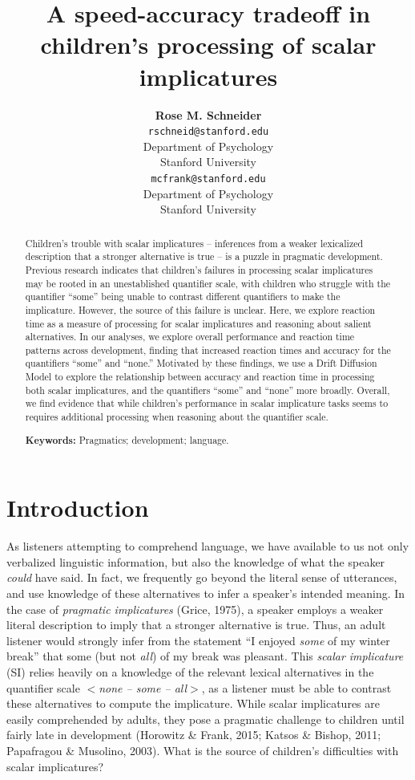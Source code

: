 \documentclass[10pt, letterpaper]{article}
\title{A speed-accuracy tradeoff in children's processing of scalar
implicatures}
\author{{\large \bf Rose M. Schneider} \\ \texttt{rschneid@stanford.edu} \\ Department of Psychology \\ Stanford University \And {\large \bf Michael C. Frank} \\ \texttt{mcfrank@stanford.edu} \\ Department of Psychology \\ Stanford University}
\begin{document}
\maketitle

\begin{abstract}
Children's trouble with scalar implicatures -- inferences from a weaker
lexicalized description that a stronger alternative is true -- is a
puzzle in pragmatic development. Previous research indicates that
children's failures in processing scalar implicatures may be rooted in
an unestablished quantifier scale, with children who struggle with the
quantifier ``some'' being unable to contrast different quantifiers to
make the implicature. However, the source of this failure is unclear.
Here, we explore reaction time as a measure of processing for scalar
implicatures and reasoning about salient alternatives. In our analyses,
we explore overall performance and reaction time patterns across
development, finding that increased reaction times and accuracy for the
quantifiers ``some'' and ``none.'' Motivated by these findings, we use a
Drift Diffusion Model to explore the relationship between accuracy and
reaction time in processing both scalar implicatures, and the
quantifiers ``some'' and ``none'' more broadly. Overall, we find
evidence that while children's performance in scalar implicature tasks
seems to requires additional processing when reasoning about the
quantifier scale.

\textbf{Keywords:}
Pragmatics; development; language.
\end{abstract}

\section{Introduction}\label{introduction}

As listeners attempting to comprehend language, we have available to us
not only verbalized linguistic information, but also the knowledge of
what the speaker \emph{could} have said. In fact, we frequently go
beyond the literal sense of utterances, and use knowledge of these
alternatives to infer a speaker's intended meaning. In the case of
\emph{pragmatic implicatures} (Grice, 1975), a speaker employs a weaker
literal description to imply that a stronger alternative is true. Thus,
an adult listener would strongly infer from the statement ``I enjoyed
\emph{some} of my winter break'' that some (but not \emph{all}) of my
break was pleasant. This \emph{scalar implicature} (SI) relies heavily
on a knowledge of the relevant lexical alternatives in the quantifier
scale \(<\)\emph{none -- some -- all}\(>\), as a listener must be able
to contrast these alternatives to compute the implicature. While scalar
implicatures are easily comprehended by adults, they pose a pragmatic
challenge to children until fairly late in development (Horowitz \&
Frank, 2015; Katsos \& Bishop, 2011; Papafragou \& Musolino, 2003). What
is the source of children's difficulties with scalar implicatures?
\end{document}
